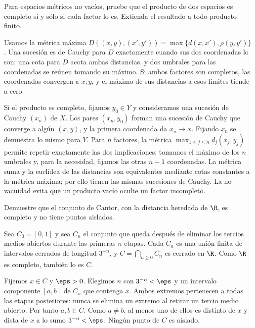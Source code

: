\begin{ejercicio}\label{ej:lectura-8-5}
Para espacios métricos no vacíos, pruebe que el producto de dos espacios es completo si y sólo si cada factor lo es. Extienda el resultado a todo producto finito.
\end{ejercicio}
\begin{solucion}
Usamos la métrica máxima $D((x,y),(x',y'))=\max\{d(x,x'),\rho(y,y')\}$. Una sucesión es de Cauchy para $D$ exactamente cuando sus dos coordenadas lo son: una cota para $D$ acota ambas distancias, y dos umbrales para las coordenadas se reúnen tomando su máximo. Si ambos factores son completos, las coordenadas convergen a $x,y$, y el máximo de sus distancias a esos límites tiende a cero.

Si el producto es completo, fijamos $y_0\in Y$ y consideramos una sucesión de Cauchy $(x_n)$ de $X$. Los pares $(x_n,y_0)$ forman una sucesión de Cauchy que converge a algún $(x,y)$, y la primera coordenada da $x_n\to x$. Fijando $x_0$ se demuestra lo mismo para $Y$. Para $n$ factores, la métrica $\max_{1\leq j\leq n}d_j(x_j,y_j)$ permite repetir exactamente las dos implicaciones: tomamos el máximo de los $n$ umbrales y, para la necesidad, fijamos las otras $n-1$ coordenadas. La métrica suma y la euclídea de las distancias son equivalentes mediante cotas constantes a la métrica máxima; por ello tienen las mismas sucesiones de Cauchy. La no vacuidad evita que un producto vacío oculte un factor incompleto.
\end{solucion}

\begin{ejercicio}\label{ej:lectura-8-6}
Demuestre que el conjunto de Cantor, con la distancia heredada de $\R$, es completo y no tiene puntos aislados.
\end{ejercicio}
\begin{solucion}
Sea $C_0=[0,1]$ y sea $C_n$ el conjunto que queda después de eliminar los tercios medios abiertos durante las primeras $n$ etapas. Cada $C_n$ es una unión finita de intervalos cerrados de longitud $3^{-n}$, y $C=\bigcap_{n\geq0}C_n$ es cerrado en $\R$. Como $\R$ es completo, también lo es $C$.

Fijemos $x\in C$ y $\eps>0$. Elegimos $n$ con $3^{-n}<\eps$ y un intervalo componente $[a,b]$ de $C_n$ que contenga $x$. Ambos extremos pertenecen a todas las etapas posteriores: nunca se elimina un extremo al retirar un tercio medio abierto. Por tanto $a,b\in C$. Como $a\ne b$, al menos uno de ellos es distinto de $x$ y dista de $x$ a lo sumo $3^{-n}<\eps$. Ningún punto de $C$ es aislado.
\end{solucion}

